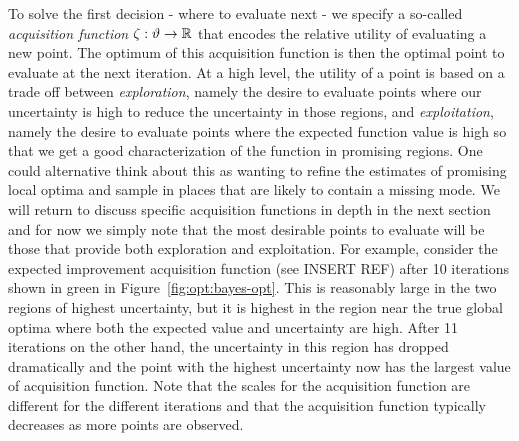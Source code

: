 To solve the first decision - where to evaluate next - we specify a so-called 
\emph{acquisition function}  $\zeta : \vartheta \rightarrow \mathbb{R}$
that encodes the relative utility of evaluating a new point.  The optimum of this
acquisition function is then the optimal point to evaluate at the next iteration.
At a high level, the utility
of a point is based on a trade off between \emph{exploration},
namely the desire to evaluate points where our uncertainty is high to reduce the
uncertainty in those regions, and \emph{exploitation}, namely the desire to evaluate points
where the expected function value is high so that we get a good characterization
of the function in promising regions.  One could alternative think about this as wanting to refine 
the estimates of promising local optima and sample in places that are likely to contain a
missing mode.
We will return to discuss specific acquisition
functions in depth in the next section and for now we simply note that the most
desirable points to evaluate will be those that provide both exploration and exploitation.
For example, consider the expected improvement acquisition function (see INSERT REF)
after 10 iterations shown in green in Figure~\ref{fig:opt:bayes-opt}.  This is reasonably
large in the two regions of highest uncertainty, but it is highest in the region near the 
true global optima where both
the expected value and uncertainty are high.  After 11 iterations on the other hand,
the uncertainty in this region has dropped dramatically and the point with the
highest uncertainty now has the largest value of acquisition function.  Note that
the scales for the acquisition function are different for the different iterations and
that the acquisition function typically decreases as more points are observed.

